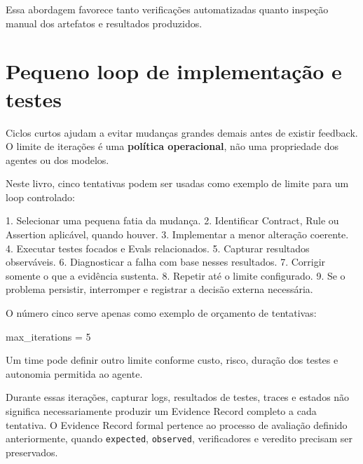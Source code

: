 \documentclass[
  10pt,
  a4paper,
  oneside]{book}
\newenvironment{Shaded}{}{}
\newcommand{\NormalTok}[1]{#1}
\renewenvironment{Shaded}{\begin{snugshade}}{\end{snugshade}}%
\begin{document}
Essa abordagem favorece tanto verificações automatizadas quanto inspeção
manual dos artefatos e resultados produzidos.

\hypertarget{pequeno-loop-de-implementauxe7uxe3o-e-testes}{%
\section{Pequeno loop de implementação e
testes}\label{pequeno-loop-de-implementauxe7uxe3o-e-testes}}

Ciclos curtos ajudam a evitar mudanças grandes demais antes de existir
feedback. O limite de iterações é uma \textbf{política operacional}, não
uma propriedade dos agentes ou dos modelos.

Neste livro, cinco tentativas podem ser usadas como exemplo de limite
para um loop controlado:

\begin{Shaded}
\begin{Highlighting}[]
\NormalTok{1. Selecionar uma pequena fatia da mudança.}
\NormalTok{2. Identificar Contract, Rule ou Assertion aplicável, quando houver.}
\NormalTok{3. Implementar a menor alteração coerente.}
\NormalTok{4. Executar testes focados e Evals relacionados.}
\NormalTok{5. Capturar resultados observáveis.}
\NormalTok{6. Diagnosticar a falha com base nesses resultados.}
\NormalTok{7. Corrigir somente o que a evidência sustenta.}
\NormalTok{8. Repetir até o limite configurado.}
\NormalTok{9. Se o problema persistir, interromper e registrar a decisão externa necessária.}
\end{Highlighting}
\end{Shaded}

O número cinco serve apenas como exemplo de orçamento de tentativas:

\begin{Shaded}
\begin{Highlighting}[]
\NormalTok{max\_iterations = 5}
\end{Highlighting}
\end{Shaded}

Um time pode definir outro limite conforme custo, risco, duração dos
testes e autonomia permitida ao agente.

Durante essas iterações, capturar logs, resultados de testes, traces e
estados não significa necessariamente produzir um Evidence Record
completo a cada tentativa. O Evidence Record formal pertence ao processo
de avaliação definido anteriormente, quando \texttt{expected},
\texttt{observed}, verificadores e veredito precisam ser preservados.
\end{document}

